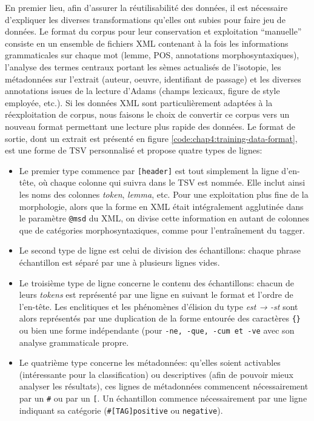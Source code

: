 En premier lieu, afin d'assurer la réutilisabilité des données, il est nécessaire d'expliquer les diverses transformations qu'elles ont subies pour faire jeu de données. Le format du corpus pour leur conservation et exploitation \enquote{manuelle} consiste en un ensemble de fichiers XML contenant à la fois les informations grammaticales sur chaque mot (lemme, POS, annotations morphosyntaxiques), l'analyse des termes centraux portant les sèmes actualisés de l'isotopie, les métadonnées sur l'extrait (auteur, oeuvre, identifiant de passage) et les diverses annotations issues de la lecture d'Adams (champs lexicaux, figure de style employée, etc.). Si les données XML sont particulièrement adaptées à la réexploitation de corpus, nous faisons le choix de convertir ce corpus vers un nouveau format permettant une lecture plus rapide des données. Le format de sortie, dont un extrait est présenté en figure \ref{code:chap4:training-data-format}, est une forme de TSV personnalisé et propose quatre types de lignes:
\begin{itemize}
    \item Le premier type commence par \texttt{[header]} est tout simplement la ligne d'en-tête, où chaque colonne qui suivra dans le TSV est nommée. Elle inclut ainsi les noms des colonnes \textit{token}, \textit{lemma}, etc. Pour une exploitation plus fine de la morphologie, alors que la forme en XML était intégralement agglutinée dans le paramètre \texttt{@msd} du XML, on divise cette information en autant de colonnes que de catégories morphosyntaxiques, comme pour l'entraînement du tagger.
    \item Le second type de ligne est celui de division des échantillons: chaque phrase échantillon est séparé par une à plusieurs lignes vides.
    \item Le troisième type de ligne concerne le contenu des échantillons: chacun de leurs \textit{tokens} est représenté par une ligne en suivant le format et l'ordre de l'en-tête. Les enclitiques et les phénomènes d'élision du type \textit{est → -st} sont alors représentés par une duplication de la forme entourée des caractères \texttt{\{\}} ou bien une forme indépendante (pour \texttt{-ne, -que, -cum et -ve} avec son analyse grammaticale propre.
    \item Le quatrième type concerne les métadonnées: qu'elles soient activables (intéressante pour la classification) ou descriptives (afin de pouvoir mieux analyser les résultats), ces lignes de métadonnées commencent nécessairement par un \texttt{\#} ou par un \texttt{[}. Un échantillon commence nécessairement par une ligne indiquant sa catégorie (\texttt{\#[TAG]positive} ou \texttt{negative}). 
\end{itemize}

